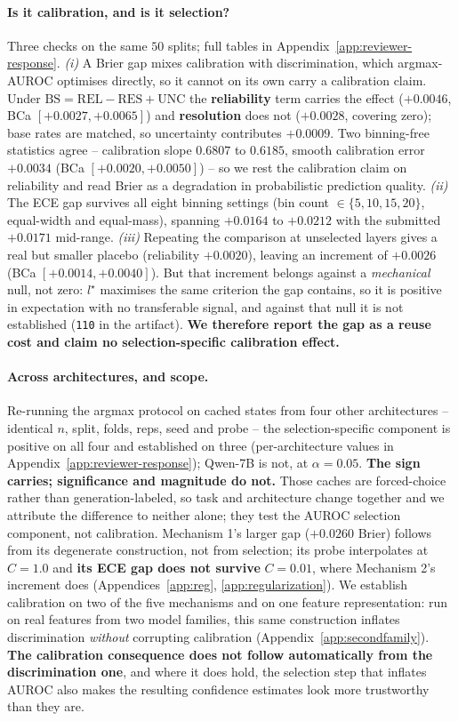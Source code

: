 \documentclass{article}
\begin{document}
\paragraph{Is it calibration, and is it selection?} Three checks on the same
$50$ splits; full tables in Appendix~\ref{app:reviewer-response}.
\emph{(i)} A Brier gap mixes calibration with discrimination, which
argmax-AUROC optimises directly, so it cannot on its own carry a calibration
claim. Under $\mathrm{BS}=\mathrm{REL}-\mathrm{RES}+\mathrm{UNC}$ the
\textbf{reliability} term carries the effect ($+0.0046$, BCa
$[+0.0027,+0.0065]$) and \textbf{resolution} does not ($+0.0028$, covering
zero); base rates are matched, so uncertainty contributes $+0.0009$. Two
binning-free statistics agree -- calibration slope $0.6807$ to $0.6185$, smooth
calibration error $+0.0034$ (BCa $[+0.0020,+0.0050]$) -- so we rest the
calibration claim on reliability and read Brier as a degradation in
probabilistic prediction quality.
\emph{(ii)} The ECE gap survives all eight binning settings (bin count
$\in\{5,10,15,20\}$, equal-width and equal-mass), spanning $+0.0164$ to
$+0.0212$ with the submitted $+0.0171$ mid-range.
\emph{(iii)} Repeating the comparison at unselected layers gives a real but
smaller placebo (reliability $+0.0020$), leaving an increment of $+0.0026$
(BCa $[+0.0014,+0.0040]$). But that increment belongs against a
\emph{mechanical} null, not zero: $l^\star$ maximises the same criterion the
gap contains, so it is positive in expectation with no transferable signal, and
against that null it is not established (\texttt{110} in the artifact).
\textbf{We therefore report the gap as a reuse cost and claim no
selection-specific calibration effect.}

\paragraph{Across architectures, and scope.} Re-running the argmax protocol on
cached states from four other architectures -- identical $n$, split, folds,
reps, seed and probe -- the selection-specific component is positive on all
four and established on three (per-architecture values in
Appendix~\ref{app:reviewer-response}); Qwen-7B is not, at $\alpha{=}0.05$.
\textbf{The sign carries; significance and magnitude do not.} Those caches are
forced-choice rather than generation-labeled, so task and architecture change
together and we attribute the difference to neither alone; they test the AUROC
selection component, not calibration. Mechanism 1's larger gap ($+0.0260$
Brier) follows from its degenerate construction, not from selection; its probe
interpolates at $C{=}1.0$ and \textbf{its ECE gap does not survive} $C{=}0.01$,
where Mechanism 2's increment does (Appendices~\ref{app:reg},
\ref{app:regularization}). We establish calibration on two of the five
mechanisms and on one feature representation: run on real features from two
model families, this same construction inflates discrimination \emph{without}
corrupting calibration (Appendix~\ref{app:secondfamily}). \textbf{The
calibration consequence does not follow automatically from the discrimination
one}, and where it does hold, the selection step that inflates AUROC also makes
the resulting confidence estimates look more trustworthy than they are.
\end{document}
